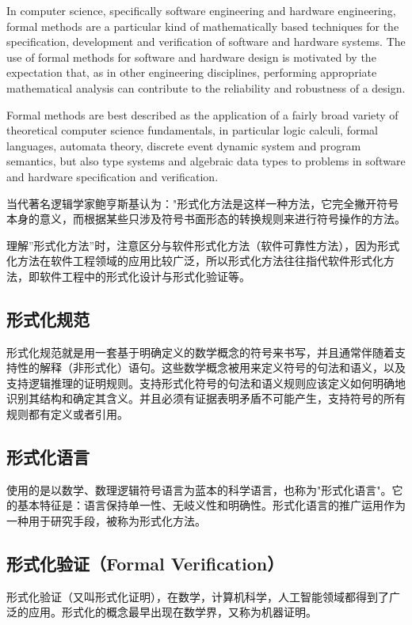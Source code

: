 \documentclass[cs4size,a4pape,UTF8]{ctexart}
\numberwithin{equation}{section}
\numberwithin{table}{section}
\numberwithin{figure}{section}
\begin{document}
In computer science, specifically software engineering and hardware engineering, formal methods are a particular kind of mathematically based techniques for the specification, development and verification of software and hardware systems. The use of formal methods for software and hardware design is motivated by the expectation that, as in other engineering disciplines, performing appropriate mathematical analysis can contribute to the reliability and robustness of a design.

Formal methods are best described as the application of a fairly broad variety of theoretical computer science fundamentals, in particular logic calculi, formal languages, automata theory, discrete event dynamic system and program semantics, but also type systems and algebraic data types to problems in software and hardware specification and verification\cite{formalmethods}.

当代著名逻辑学家鲍亨斯基认为："形式化方法是这样一种方法，它完全撇开符号本身的意义，而根据某些只涉及符号书面形态的转换规则来进行符号操作的方法。

理解''形式化方法''时，注意区分与软件形式化方法（软件可靠性方法），因为形式化方法在软件工程领域的应用比较广泛，所以形式化方法往往指代软件形式化方法，即软件工程中的形式化设计与形式化验证等。


\subsection{形式化规范}
形式化规范就是用一套基于明确定义的数学概念的符号来书写，并且通常伴随着支持性的解释（非形式化）语句。这些数学概念被用来定义符号的句法和语义，以及支持逻辑推理的证明规则。支持形式化符号的句法和语义规则应该定义如何明确地识别其结构和确定其含义。并且必须有证据表明矛盾不可能产生，支持符号的所有规则都有定义或者引用。

\subsection{形式化语言}
使用的是以数学、数理逻辑符号语言为蓝本的科学语言，也称为"形式化语言"。它的基本特征是：语言保持单一性、无岐义性和明确性。形式化语言的推广运用作为一种用于研究手段，被称为形式化方法。

\subsection{形式化验证（Formal Verification）}
形式化验证（又叫形式化证明），在数学，计算机科学，人工智能领域都得到了广泛的应用。形式化的概念最早出现在数学界，又称为机器证明。
\end{document}
